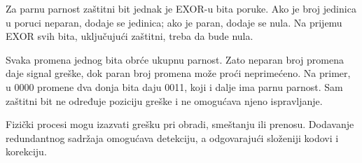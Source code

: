 Za parnu parnost zaštitni bit jednak je EXOR-u bita poruke. Ako je broj jedinica u poruci neparan, dodaje se jedinica; ako je paran, dodaje se nula. Na prijemu EXOR svih bita, uključujući zaštitni, treba da bude nula.

Svaka promena jednog bita obrće ukupnu parnost. Zato neparan broj promena daje signal greške, dok paran broj promena može proći neprimećeno. Na primer, u 0000 promene dva donja bita daju 0011, koji i dalje ima parnu parnost. Sam zaštitni bit ne određuje poziciju greške i ne omogućava njeno ispravljanje.

Fizički procesi mogu izazvati grešku pri obradi, smeštanju ili prenosu. Dodavanje redundantnog sadržaja omogućava detekciju, a odgovarajući složeniji kodovi i korekciju.
